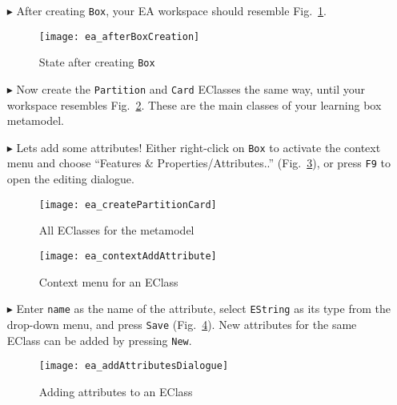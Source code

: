 \begin{itemize}
\item[$\blacktriangleright$] After creating \texttt{Box}, your EA workspace should resemble Fig.~\ref{fig:eclass_completed}.

\vspace{0.5cm}

\begin{figure}[htbp]
	\centering
  \texttt{[image: ea\_afterBoxCreation]}
	\caption{State after creating \texttt{Box}}
	\label{fig:eclass_completed}
\end{figure}

\item[$\blacktriangleright$] Now create the \texttt{Partition} and \texttt{Card} EClasses the same way, until your workspace resembles
Fig.~\ref{fig:all_eclasses}. These are the main classes of your learning box metamodel.

\vspace{0.5cm}

\item[$\blacktriangleright$] Lets add some attributes! Either right-click on \texttt{Box} to activate the context menu and choose ``Features \&
Properties/Attributes..'' (Fig.~\ref{fig:attribute}), or press \texttt{F9} to open the editing dialogue.

\begin{figure}[htbp]
	\centering
  \texttt{[image: ea\_createPartitionCard]}
	\caption{All EClasses for the metamodel}
	\label{fig:all_eclasses}
\end{figure}

\begin{figure}[htbp]
	\centering
  \texttt{[image: ea\_contextAddAttribute]}
	\caption{Context menu for an EClass}
	\label{fig:attribute}
\end{figure}
\FloatBarrier

\item[$\blacktriangleright$] Enter \texttt{name} as the name of the attribute, select \texttt{EString} as its type from the drop-down menu, and press
\texttt{Save} (Fig.~\ref{fig:attribute_properties}). New attributes for the same EClass can be added by pressing \texttt{New}.

\vspace{1.0cm}

\begin{figure}[htbp]
	\centering
  \texttt{[image: ea\_addAttributesDialogue]}
	\caption{Adding attributes to an EClass}
	\label{fig:attribute_properties}
\end{figure}


\end{itemize}
